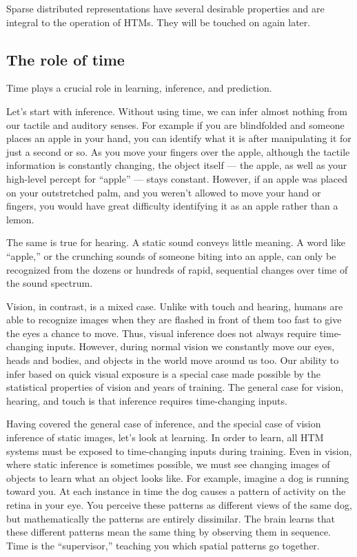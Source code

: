 \documentclass{report}
\begin{document}
Sparse distributed representations have several desirable properties
and are integral to the operation of HTMs. They will be touched on
again later.

\subsection*{The role of time}

Time plays a crucial role in learning, inference, and prediction.

Let's start with inference. Without using time, we can infer almost
nothing from our tactile and auditory senses. For example if you are
blindfolded and someone places an apple in your hand, you can identify
what it is after manipulating it for just a second or so. As you move
your fingers over the apple, although the tactile information is
constantly changing, the object itself --- the apple, as well as your
high-level percept for ``apple'' --- stays constant. However, if an
apple was placed on your outstretched palm, and you weren't allowed to
move your hand or fingers, you would have great difficulty identifying
it as an apple rather than a lemon.

The same is true for hearing. A static sound conveys little meaning. A
word like ``apple,'' or the crunching sounds of someone biting into an
apple, can only be recognized from the dozens or hundreds of rapid,
sequential changes over time of the sound spectrum.

Vision, in contrast, is a mixed case. Unlike with touch and hearing,
humans are able to recognize images when they are flashed in front of
them too fast to give the eyes a chance to move. Thus, visual
inference does not always require time-changing inputs. However,
during normal vision we constantly move our eyes, heads and bodies,
and objects in the world move around us too. Our ability to infer
based on quick visual exposure is a special case made possible by the
statistical properties of vision and years of training. The general
case for vision, hearing, and touch is that inference requires
time-changing inputs.

Having covered the general case of inference, and the special case of
vision inference of static images, let's look at learning. In order to
learn, all HTM systems must be exposed to time-changing inputs during
training. Even in vision, where static inference is sometimes
possible, we must see changing images of objects to learn what an
object looks like. For example, imagine a dog is running toward
you. At each instance in time the dog causes a pattern of activity on
the retina in your eye. You perceive these patterns as different views
of the same dog, but mathematically the patterns are entirely
dissimilar. The brain learns that these different patterns mean the
same thing by observing them in sequence. Time is the ``supervisor,''
teaching you which spatial patterns go together.
\end{document}
